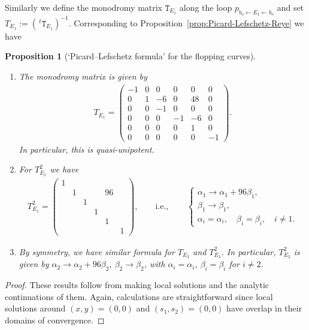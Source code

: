 \documentclass[pdftex]{sigma}
\numberwithin{equation}{section}
\newtheorem{Proposition}[Theorem]{Proposition}
\begin{document}
Similarly we define the monodromy matrix $\mathtt{T}_{E_{1}}$ along the loop $p_{b_{o}\leftarrow E_{1}\leftarrow b_{o}}$ and set $T_{E_{1}}:=(\,^{t}\mathtt{T}_{E_{1}})^{-1}$. Corresponding to Proposition~\ref{prop:Picard-Lefschetz-Reye} we have
\begin{Proposition}[`Picard--Lefschetz formula' for the flopping curves] \label{prop:Picard--Lefschetz-P3P3}
\quad \begin{enumerate}\itemsep=0pt
\item[{\rm (1)}] The monodromy matrix is given by
\begin{gather*}
T_{E_{1}}=\left(\begin{smallmatrix}-1 & 0 & 0 & 0 & 0 & 0\\
0 & 1 & -6 & 0 & 48 & 0\\
0 & 0 & -1 & 0 & 0 & 0\\
0 & 0 & 0 & -1 & -6 & 0\\
0 & 0 & 0 & 0 & 1 & 0\\
0 & 0 & 0 & 0 & 0 & -1
\end{smallmatrix}\right).
\end{gather*}
In particular, this is quasi-unipotent.

\item[{\rm (2)}] For $T_{E_{1}}^{2}$ we have
\begin{gather*}
T_{E_{1}}^{2}=\left(\begin{smallmatrix}1\\
 & 1 & & & 96\\
 & & 1\\
 & & & 1\\
 & & & & 1\\
 & & & & & 1
\end{smallmatrix}\right),\qquad \text{i.e.},\qquad \begin{cases}
\alpha_{1}\to\alpha_{1}+96\beta_{1},\\
\beta_{1}\to\beta_{1},\\
\alpha_{i}=\alpha_{i}, \quad \beta_{i}=\beta_{i}, \quad i\not=1.
\end{cases}
\end{gather*}

\item[{\rm (3)}] By symmetry, we have similar formula for $T_{E_{2}}$ and $T_{E_{2}}^{2}$. In particular, $T_{E_{2}}^{2}$ is given by
$\alpha_{2}\to\alpha_{2}+96\beta_{2}$, $\beta_{2}\to\beta_{2}$, with $\alpha_{i}=\alpha_{i}$, $\beta_{i}=\beta_{i}$ for $i\not=2$.

\end{enumerate}\end{Proposition}
\begin{proof}These results follow from making local solutions and the analytic continuations of them. Again, calculations are straightforward since local solutions around $(x,y)=(0,0)$ and $(s_{1},s_{2})=(0,0)$ have overlap in their domains of convergence. \end{proof}
\end{document}
